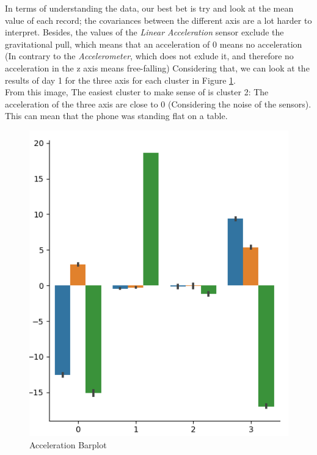 \documentclass[idxtotoc,hyperref,openany]{labbook} %
\begin{document}
In terms of understanding the data, our best bet is try and look at the mean value of each record; the covariances between the different axis are a lot harder to interpret. Besides, the values of the \textit{Linear Acceleration} sensor exclude the gravitational pull, which means that an acceleration of 0 means no acceleration (In contrary to the \textit{Accelerometer}, which does not exlude it, and therefore no acceleration in the z axis means free-falling) Considering that, we can look at the results of day 1 for the three axis for each cluster in Figure \ref{Acceleration Factorplot}.\\
From this image, The easiest cluster to make sense of is cluster 2: The acceleration of the three axis are close to 0 (Considering the noise of the sensors). This can mean that the phone was standing flat on a table. 

\begin{figure}[h]
\includegraphics[width=0.9\linewidth]{AccelerometerResultsDay1.png}
\setlength\belowcaptionskip{-10pt}
\caption{Acceleration Barplot}
\label{Acceleration Factorplot}
\end{figure}
\end{document}
